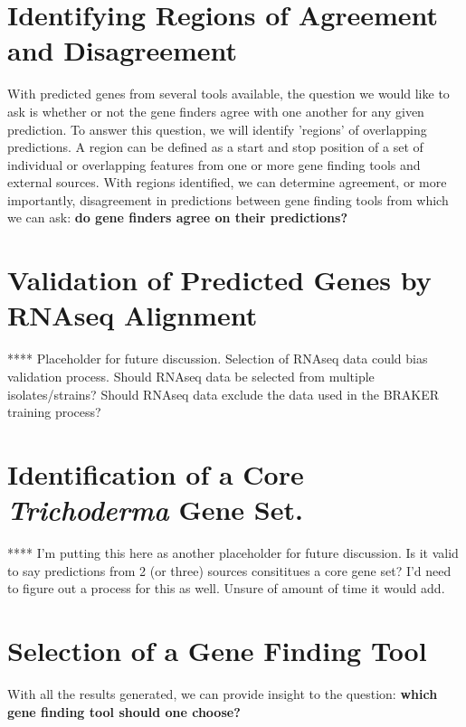 \section{Identifying Regions of Agreement and Disagreement}

With predicted genes from several tools available, the question we
would like to ask is whether or not the gene finders agree with one
another for any given prediction. To answer this question, we will
identify 'regions' of overlapping predictions. A region can be defined
as a start and stop position of a set of individual or overlapping
features from one or more gene finding tools and external
sources. With regions identified, we can determine agreement, or more
importantly, disagreement in predictions between gene finding tools
from which we can ask: \textbf{do gene finders agree on their
  predictions?}

\section{Validation of Predicted Genes by RNAseq Alignment}

**** Placeholder for future discussion. Selection of RNAseq data could
bias validation process. Should RNAseq data be selected from multiple
isolates/strains? Should RNAseq data exclude the data used in the
BRAKER training process?

\section{Identification of a Core \textit{Trichoderma} Gene Set.}

**** I'm putting this here as another placeholder for future
discussion. Is it valid to say predictions from 2 (or three) sources
consititues a core gene set? I'd need to figure out a process for this
as well. Unsure of amount of time it would add.

\section{Selection of a Gene Finding Tool}

With all the results generated, we can provide insight to the
question: \textbf{which gene finding tool should one choose?}
